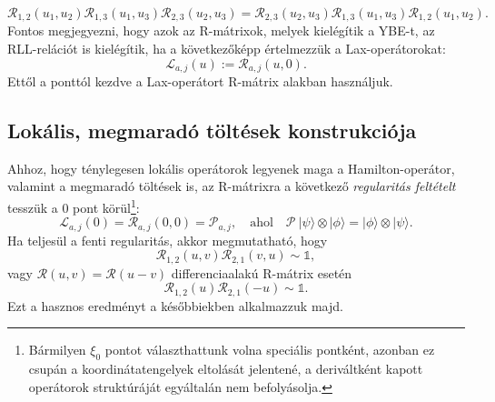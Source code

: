 \documentclass[12pt,a4paper,oneside]{report}
\newcommand{\R}{\mathcal{R}}
\renewcommand{\L}{\mathcal{L}}
\renewcommand{\P}{\mathcal{P}}
\newcommand{\id}{\mathds{1}}
\begin{document}
\begin{equation}\label{eq:YBE}
    \R_{1,2}(u_1,u_2)\R_{1,3}(u_1,u_3)\R_{2,3}(u_2,u_3)=\R_{2,3}(u_2,u_3)\R_{1,3}(u_1,u_3)\R_{1,2}(u_1,u_2).
\end{equation}
Fontos megjegyezni, hogy azok az R-mátrixok, melyek kielégítik a YBE-t, az RLL-relációt is kielégítik, ha a következőképp értelmezzük a Lax-operátorokat:
\begin{equation}\label{eq:laxfromR}
    \L_{a,j}(u):=\R_{a,j}(u,0).
\end{equation}
Ettől a ponttól kezdve a Lax-operátort R-mátrix alakban használjuk.


\subsection{Lokális, megmaradó töltések konstrukciója}
Ahhoz, hogy ténylegesen lokális operátorok legyenek maga a Hamilton-operátor, valamint a megmaradó töltések is, az R-mátrixra a következő \textit{regularitás feltételt} tesszük a 0 pont körül\footnote{Bármilyen $\xi_0$ pontot választhattunk volna speciális pontként, azonban ez csupán a koordinátatengelyek eltolását jelentené, a deriváltként kapott operátorok struktúráját egyáltalán nem befolyásolja.}:
\begin{equation}
    \L_{a,j}(0)=\R_{a,j}(0,0)=\P_{a,j}, \quad \text{ahol}\quad \P\ |\psi\rangle\otimes|\phi\rangle=|\phi\rangle\otimes|\psi\rangle.
\end{equation}
Ha teljesül a fenti regularitás, akkor megmutatható, hogy
\begin{equation}\label{eq:regularity}
    \R_{1,2}(u,v)\R_{2,1}(v,u)\sim\id,
\end{equation}
vagy $\R(u,v)=\R(u-v)$ differenciaalakú R-mátrix esetén
\begin{equation}\label{eq:regularity_diff}
    \R_{1,2}(u)\R_{2,1}(-u)\sim\id.
\end{equation}
Ezt a hasznos eredményt a későbbiekben alkalmazzuk majd.\\
\end{document}
